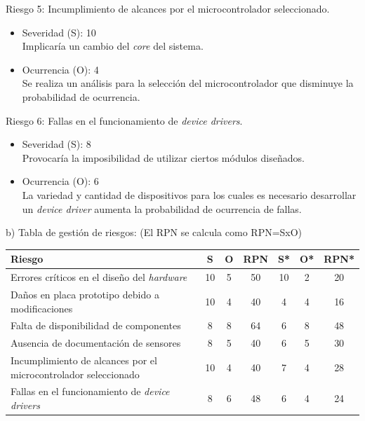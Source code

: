 \documentclass[
11pt, %
]{charter}
\begin{document}
Riesgo 5: Incumplimiento de alcances por el microcontrolador seleccionado.
\begin{itemize}
	\item Severidad (S): 10\\
	Implicaría un cambio del \textit{core} del sistema.
	\item Ocurrencia (O): 4\\
	Se realiza un análisis para la selección del microcontrolador que disminuye la probabilidad de ocurrencia.
\end{itemize}

Riesgo 6: Fallas en el funcionamiento de \textit{device drivers}.
\begin{itemize}
	\item Severidad (S): 8\\
		Provocaría la imposibilidad de utilizar ciertos módulos diseñados.
	\item Ocurrencia (O): 6\\
	La variedad y cantidad de dispositivos para los cuales es necesario desarrollar un \textit{device driver} aumenta la probabilidad de ocurrencia de fallas.
\end{itemize}

b) Tabla de gestión de riesgos:      (El RPN se calcula como RPN=SxO)

\begin{table}[htpb]
\centering
\begin{tabularx}{\linewidth}{@{}|X|c|c|c|c|c|c|@{}}
\hline
\rowcolor[HTML]{C0C0C0} 

Riesgo & S & O & RPN & S* & O* & RPN* \\ \hline
Errores críticos en el diseño del \textit{hardware} 			& 10   	& 5  	& 50    & 10   	& 2 & 20    \\ \hline
Daños en placa prototipo debido a modificaciones 				& 10	& 4		& 40	& 4		& 4	& 16 	\\ \hline
Falta de disponibilidad de componentes 							& 8    	& 8  	& 64    & 6   	& 8 & 48    \\ \hline
Ausencia de documentación de sensores  							& 8   	& 5  	& 40    & 6  	& 5 & 30    \\ \hline
Incumplimiento de alcances por el microcontrolador seleccionado & 10  	& 4  	& 40 	& 7   	& 4 & 28    \\ \hline
Fallas en el funcionamiento de \textit{device drivers}       	& 8		& 6  	& 48    & 6  	& 4	& 24    \\ \hline

\end{tabularx}%
\end{table}
\end{document}
